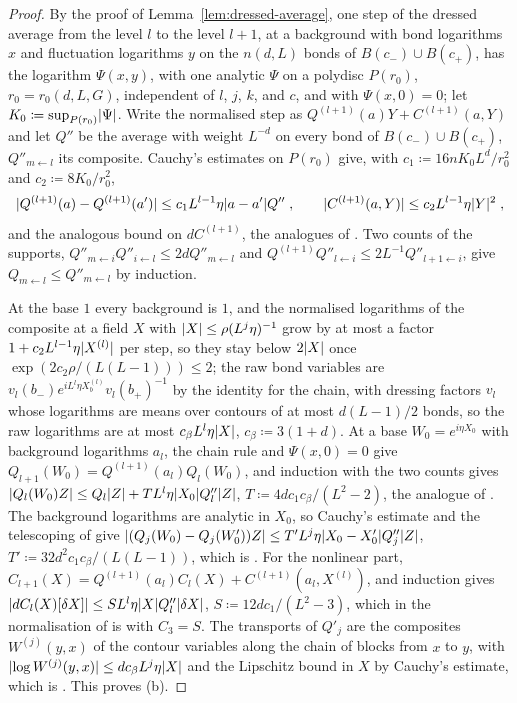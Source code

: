\documentclass[11pt]{preprint}
\DeclarePairedDelimiter{\abs}{\lvert}{\rvert}
\numberwithin{equation}{section}
\theoremstyle{definition}
\theoremstyle{remark}
\theoremstyle{plain}
\begin{document}
\begin{proof}
By the proof of Lemma~\ref{lem:dressed-average}, one step of the dressed average from the level $l$ to the level $l + 1$, at a background with bond logarithms $x$ and fluctuation logarithms $y$ on the $n(d, L)$ bonds of $B(c_-) \cup B(c_+)$, has the logarithm $\Psi(x, y)$, with one analytic $\Psi$ on a polydisc $P(r_0)$, $r_0 = r_0(d, L, G)$, independent of $l$, $j$, $k$, and $c$, and with $\Psi(x, 0) = 0$; let $K_0 \coloneqq \sup_{P(r_0)}\abs\Psi$. Write the normalised step as $Q^{(l+1)}(a)Y + C^{(l+1)}(a, Y)$ and let $Q''$ be the average with weight $L^{-d}$ on every bond of $B(c_-) \cup B(c_+)$, $Q''_{m \leftarrow l}$ its composite. Cauchy's estimates on $P(r_0)$ give, with $c_1 \coloneqq 16nK_0L^d/r_0^2$ and $c_2 \coloneqq 8K_0/r_0^2$,
\begin{equation*}
    \abs{Q^{(l+1)}(a) - Q^{(l+1)}(a')} \leq c_1L^{l-1}\eta\abs{a - a'}Q''\;,
    \qquad
    \abs{C^{(l+1)}(a, Y)} \leq c_2L^{l-1}\eta\abs Y^2\;,
\end{equation*}
and the analogous bound on $dC^{(l+1)}$, the analogues of \cite[(139), (148)]{BalabanAVG}. Two counts of the supports, $Q''_{m \leftarrow i}Q''_{i \leftarrow l} \leq 2dQ''_{m \leftarrow l}$ and $Q^{(l+1)}Q''_{l \leftarrow i} \leq 2L^{-1}Q''_{l+1 \leftarrow i}$, give $Q_{m \leftarrow l} \leq Q''_{m \leftarrow l}$ by induction.

At the base $1$ every background is $1$, and the normalised logarithms of the composite at a field $X$ with $\abs X \leq \rho(L^j\eta)^{-1}$ grow by at most a factor $1 + c_2L^{l-1}\eta\abs{X^{(l)}}$ per step, so they stay below $2\abs X$ once $\exp(2c_2\rho/(L(L - 1))) \leq 2$; the raw bond variables are $v_l(b_-)e^{iL^l\eta X^{(l)}_b}v_l(b_+)^{-1}$ by the identity \cite[(97)]{BalabanAVG} for the chain, with dressing factors $v_l$ whose logarithms are means over contours of at most $d(L - 1)/2$ bonds, so the raw logarithms are at most $c_\beta L^l\eta\abs X$, $c_\beta \coloneqq 3(1 + d)$. At a base $W_0 = e^{i\eta X_0}$ with background logarithms $a_l$, the chain rule and $\Psi(x, 0) = 0$ give $Q_{l+1}(W_0) = Q^{(l+1)}(a_l)Q_l(W_0)$, and induction with the two counts gives $\abs{Q_l(W_0)Z} \leq Q_l\abs Z + TL^l\eta\abs{X_0}Q''_l\abs Z$, $T \coloneqq 4dc_1c_\beta/(L^2 - 2)$, the analogue of \cite[(143)]{BalabanAVG}. The background logarithms are analytic in $X_0$, so Cauchy's estimate and the telescoping of \cite[(3.80)]{BalabanPBG} give $\abs{(Q_j(W_0) - Q_j(W'_0))Z} \leq T'L^j\eta\abs{X_0 - X'_0}Q''_j\abs Z$, $T' \coloneqq 32d^2c_1c_\beta/(L(L - 1))$, which is \cite[(3.79)--(3.81)]{BalabanPBG}. For the nonlinear part, $C_{l+1}(X) = Q^{(l+1)}(a_l)C_l(X) + C^{(l+1)}(a_l, X^{(l)})$, and induction gives $\abs{dC_l(X)[\delta X]} \leq SL^l\eta\abs XQ''_l\abs{\delta X}$, $S \coloneqq 12dc_1/(L^2 - 3)$, which in the normalisation of \cite[(150)]{BalabanAVG} is \cite[(149)]{BalabanAVG} with $C_3 = S$. The transports of $Q'_j$ are the composites $W^{(j)}(y, x)$ of the contour variables along the chain of blocks from $x$ to $y$, with $\abs{\log W^{(j)}(y, x)} \leq dc_\beta L^j\eta\abs X$ and the Lipschitz bound in $X$ by Cauchy's estimate, which is \cite[(3.58)--(3.59)]{BalabanPBG}. This proves (b).


\end{proof}
\end{document}
